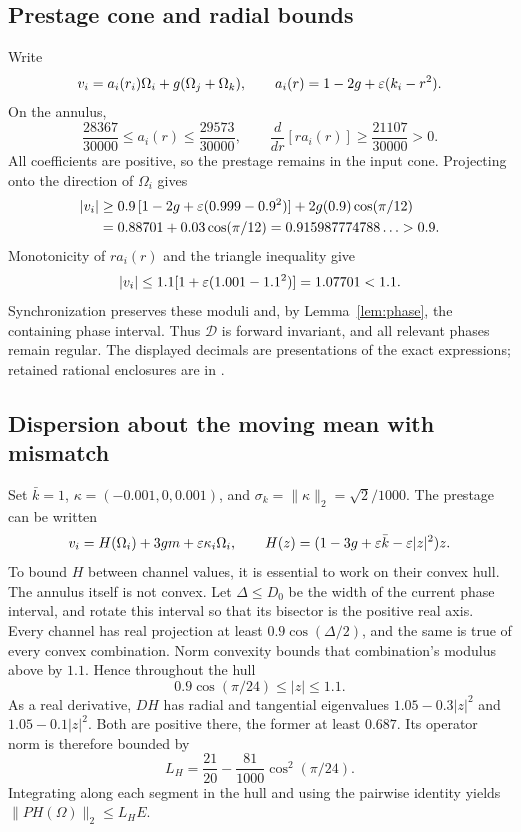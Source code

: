 \documentclass[11pt,a4paper]{article}
\numberwithin{equation}{section}
\theoremstyle{remark}\newtheorem{remark}[theorem]{Remark}
\begin{document}
\subsection{Prestage cone and radial bounds}
Write
\begin{equation}
v_i=a_i(r_i)\Omega_i+g(\Omega_j+\Omega_k),
\qquad a_i(r)=1-2g+\varepsilon(k_i-r^2).
\end{equation}
On the annulus,
\begin{equation}
\frac{28367}{30000}\le a_i(r)\le\frac{29573}{30000},
\qquad
\frac{d}{dr}[ra_i(r)]\ge\frac{21107}{30000}>0.
\label{eq:apos}
\end{equation}
All coefficients are positive, so the prestage remains in the input cone. Projecting onto the direction of $\Omega_i$ gives
\begin{align}
|v_i|&\ge0.9\,[1-2g+\varepsilon(0.999-0.9^2)]
                  +2g(0.9)\cos(\pi/12)\notag\\
&=0.88701+0.03\cos(\pi/12)
=0.915987774788\ldots>0.9.\label{eq:lower}
\end{align}
Monotonicity of $ra_i(r)$ and the triangle inequality give
\begin{equation}
|v_i|\le1.1[1+\varepsilon(1.001-1.1^2)]=1.07701<1.1.\label{eq:upper}
\end{equation}
Synchronization preserves these moduli and, by Lemma~\ref{lem:phase}, the containing phase interval. Thus $\mathcal D$ is forward invariant, and all relevant phases remain regular. The displayed decimals are presentations of the exact expressions; retained rational enclosures are in \cite{domainreceipt}.

\subsection{Dispersion about the moving mean with mismatch}
Set $\bar k=1$, $\kappa=(-0.001,0,0.001)$, and $\sigma_k=\|\kappa\|_2=\sqrt2/1000$. The prestage can be written
\begin{equation}
v_i=H(\Omega_i)+3gm+\varepsilon\kappa_i\Omega_i,
\qquad H(z)=(1-3g+\varepsilon\bar k-\varepsilon|z|^2)z.
\end{equation}
To bound $H$ between channel values, it is essential to work on their convex hull. The annulus itself is not convex. Let $\Delta\le D_0$ be the width of the current phase interval, and rotate this interval so that its bisector is the positive real axis. Every channel has real projection at least $0.9\cos(\Delta/2)$, and the same is true of every convex combination. Norm convexity bounds that combination's modulus above by $1.1$. Hence throughout the hull
\begin{equation}
0.9\cos(\pi/24)\le|z|\le1.1.
\label{eq:hull}
\end{equation}
As a real derivative, $DH$ has radial and tangential eigenvalues $1.05-0.3|z|^2$ and $1.05-0.1|z|^2$. Both are positive there, the former at least $0.687$. Its operator norm is therefore bounded by
\begin{equation}
L_H=\frac{21}{20}-\frac{81}{1000}\cos^2(\pi/24).
\end{equation}
Integrating along each segment in the hull and using the pairwise identity yields $\|PH(\Omega)\|_2\le L_HE$.
\end{document}
